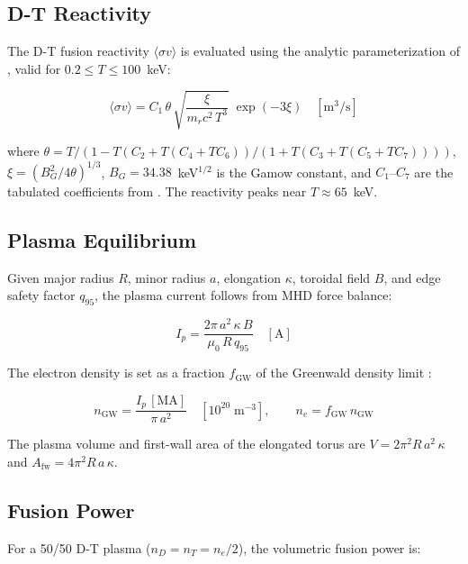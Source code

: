 \documentclass{article}
\begin{document}
\subsection{D-T Reactivity}

The D-T fusion reactivity $\langle\sigma v\rangle$ is evaluated using
the analytic parameterization of \citet{boschhale1992}, valid for
$0.2 \leq T \leq 100$~keV:

\begin{equation}
\label{eq:sigma-v}
\langle\sigma v\rangle = C_1\,\theta\,
  \sqrt{\frac{\xi}{m_r c^2\,T^3}}\;\exp(-3\xi)
  \quad [\text{m}^3/\text{s}]
\end{equation}

\noindent where $\theta = T / (1 - T(C_2 + T(C_4 + TC_6))/(1 + T(C_3 + T(C_5 + TC_7))))$,
$\xi = (B_G^2 / 4\theta)^{1/3}$, $B_G = 34.38$~keV$^{1/2}$ is the
Gamow constant, and $C_1$--$C_7$ are the tabulated coefficients from
\citet{boschhale1992}. The reactivity peaks near $T \approx 65$~keV.

\subsection{Plasma Equilibrium}

Given major radius $R$, minor radius $a$, elongation $\kappa$,
toroidal field $B$, and edge safety factor $q_{95}$, the plasma
current follows from MHD force balance:

\begin{equation}
\label{eq:ip}
I_p = \frac{2\pi\,a^2\,\kappa\,B}{\mu_0\,R\,q_{95}}
  \quad [\text{A}]
\end{equation}

The electron density is set as a fraction $f_{\text{GW}}$ of the
Greenwald density limit \citep{iterphysics1999}:

\begin{equation}
\label{eq:greenwald}
n_{\text{GW}} = \frac{I_p\,[\text{MA}]}{\pi\,a^2}
  \quad [10^{20}\;\text{m}^{-3}],
\qquad
n_e = f_{\text{GW}}\,n_{\text{GW}}
\end{equation}

The plasma volume and first-wall area of the elongated torus are
$V = 2\pi^2 R\,a^2\,\kappa$ and $A_{\text{fw}} = 4\pi^2 R\,a\,\kappa$.

\subsection{Fusion Power}

For a 50/50 D-T plasma ($n_D = n_T = n_e/2$), the volumetric fusion
power is:
\end{document}

